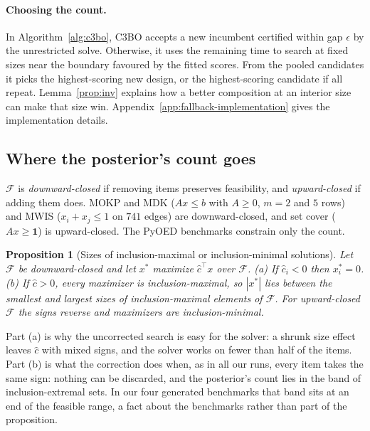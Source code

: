 \documentclass{article}
\newcommand{\revtext}[1]{{\color{blue}#1}}
\providecommand{\one}{\mathbf 1}
\providecommand{\F}{\mathcal F}
\newtheorem{proposition}{Proposition}
\theoremstyle{remark}\newtheorem{remark}[proposition]{Remark}
\begin{document}
\paragraph{Choosing the count.}
\revtext{In Algorithm~\ref{alg:c3bo}, C3BO accepts a new incumbent certified within gap $\epsilon$ by the unrestricted solve. Otherwise, it uses the remaining time to search at fixed sizes near the boundary favoured by the fitted scores. From the pooled candidates it picks the highest-scoring new design, or the highest-scoring candidate if all repeat. Lemma~\ref{prop:inv} explains how a better composition at an interior size can make that size win. Appendix~\ref{app:fallback-implementation} gives the implementation details.}

\subsection{Where the posterior's count goes}\label{sec:edge}

$\F$ is \emph{downward-closed} if removing items preserves feasibility, and
\emph{upward-closed} if adding them does. MOKP and MDK ($Ax\le b$ with $A\ge0$,
$m=2$ and $5$ rows) and MWIS ($x_i+x_j\le1$ on $741$ edges) are downward-closed,
and set cover ($Ax\ge\one$) is upward-closed. The PyOED benchmarks constrain only the count.

\begin{proposition}[Sizes of inclusion-maximal or inclusion-minimal solutions]\label{prop:edge}
Let $\F$ be downward-closed and let $x^\ast$ maximize $\hat c^\top x$ over $\F$.
(a) If $\hat c_i<0$ then $x^\ast_i=0$. (b) If $\hat c>0$, every maximizer is
inclusion-maximal, so $|x^\ast|$ lies between the smallest and largest sizes of
inclusion-maximal elements of $\F$. For upward-closed $\F$ the signs reverse and
maximizers are inclusion-minimal.
\end{proposition}

Part (a) is why the uncorrected search is easy for the solver: a shrunk size
effect leaves $\hat c$ with mixed signs, and the solver works on \revtext{fewer than half} of the items. Part (b) is what the correction does when, as in all our runs, every item
takes the same sign: nothing can be discarded, and the posterior's count lies in the band
of inclusion-extremal sets. In our four generated benchmarks that band sits at an end of the
feasible range, a fact about the benchmarks rather than part of the proposition.
\end{document}
